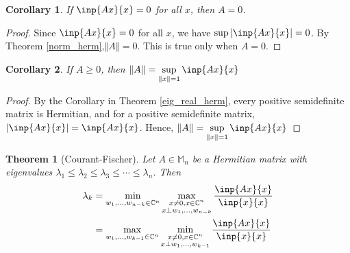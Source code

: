 \documentclass[twofold]{article}
\newcommand*\norm[1]{\left \Vert #1 \right\Vert}
\newcommand*\abs[1]{\left \vert #1 \right\vert}
\theoremstyle{plain}
\newtheorem{theorem}{Theorem}
\newtheorem*{corollary}{Corollary}
\theoremstyle{definition}
\theoremstyle{remark}
\begin{document}
\begin{corollary} If \(\inp{Ax}{x} = 0\) for all \(x\), then \(A = 0\).\end{corollary}
\begin{proof} Since \(\inp{Ax}{x} = 0\) for all \(x\), we have \(\sup \abs{\inp{Ax}{x}} = 0\). By Theorem \ref{norm_herm},\( \norm{A} = 0 \). This is true only when \(A = 0\).\end{proof}


\begin{corollary} If \(A \ge 0\), then \(\displaystyle \norm{A} = \sup _{\norm{x} = 1} \inp{Ax}{x}\) \end{corollary}
\begin{proof}   By the Corollary in Theorem \ref{eig_real_herm}, every positive semidefinite matrix is Hermitian, and for a positive semidefinite matrix, \(\abs{\inp{Ax}{x}} = \inp{Ax}{x}\). Hence, \(\norm{A} = \displaystyle \sup_{\norm{x} = 1} \inp{Ax}{x}\) \end{proof}



\begin{theorem}[Courant-Fischer] Let \(A \in \mathbb{M}_n\) be a Hermitian matrix with eigenvalues \(\lambda_1 \le \lambda_2 \le \lambda_3 \le \cdots \le \lambda_n\).  Then 
\begin{equation*}\begin{split}
 \lambda_k &= \min_{w_1, \ldots , w_{n-k} \in \mathbb{C}^n} \max_{\substack{x \neq 0, x\in \mathbb{C}^n \\ x \perp w_1, \ldots , w_{n-k}}} \frac{\inp{Ax}{x}}{\inp{x}{x}} \\
& = \max_{w_1, \ldots , w_{k -1} \in \mathbb{C}^n} \min_{\substack{x \neq 0, x\in \mathbb{C}^n \\ x \perp w_1, \ldots , w_{k - 1}}} \frac{\inp{Ax}{x}}{\inp{x}{x}}
\end{split} \end{equation*}
 \end{theorem}
\end{document}
